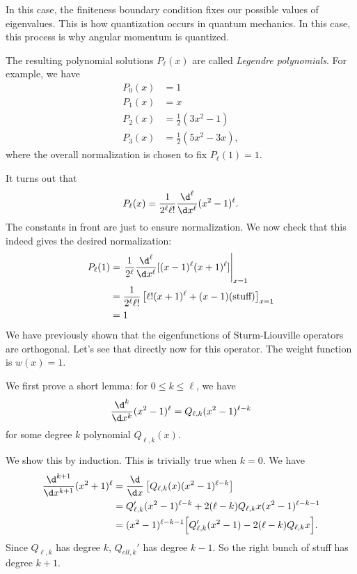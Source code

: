 \documentclass[a4paper]{article}
\begin{document}
In this case, the finiteness boundary condition fixes our possible values of eigenvalues. This is how quantization occurs in quantum mechanics. In this case, this process is why angular momentum is quantized.

The resulting polynomial solutions $P_\ell(x)$ are called \emph{Legendre polynomials}. For example, we have
\begin{align*}
  P_0(x) &= 1\\
  P_1(x) &= x\\
  P_2(x) &= \frac{1}{2}(3x^2 - 1)\\
  P_3(x) &= \frac{1}{2}(5x^2 - 3x),
\end{align*}
where the overall normalization is chosen to fix $P_\ell(1) = 1$.

It turns out that
\[
  P_\ell(x) = \frac{1}{2^\ell \ell!} \frac{\d^\ell}{\d x^\ell} (x^2 - 1)^\ell.
\]
The constants in front are just to ensure normalization. We now check that this indeed gives the desired normalization:
\begin{align*}
  P_\ell(1) &= \left.\frac{1}{2^\ell} \frac{\d^\ell}{\d x^\ell}[(x - 1)^\ell (x + 1)^\ell]\right|_{x = 1}\\
  &= \frac{1}{2^\ell \ell!} \left[\ell!(x + 1)^\ell + (x - 1)(\text{stuff})\right]_{x = 1}\\
  &= 1
\end{align*}
We have previously shown that the eigenfunctions of Sturm-Liouville operators are orthogonal. Let's see that directly now for this operator. The weight function is $w(x) = 1$.

We first prove a short lemma: for $0 \leq k \leq \ell$, we have
\[
  \frac{\d^k}{\d x^k}(x^2 - 1)^\ell = Q_{\ell, k}(x^2 - 1)^{\ell - k}
\]
for some degree $k$ polynomial $Q_{\ell, k}(x)$.

We show this by induction. This is trivially true when $k = 0$. We have
\begin{align*}
  \frac{\d^{k + 1}}{\d x^{k + 1}} (x^2 + 1)^\ell &= \frac{\d}{\d x}\left[Q_{\ell, k}(x) (x^2 - 1)^{\ell - k}\right] \\
  &= Q_{\ell, k}' (x^2 - 1)^{\ell - k} + 2(\ell - k)Q_{\ell, k} x(x^2 - 1)^{\ell - k - 1}\\
  &= (x^2 - 1)^{\ell - k - 1}\Big[Q_{\ell, k}'(x^2 - 1) - 2(\ell - k)Q_{\ell, k} x\Big].
\end{align*}
Since $Q_{\ell, k}$ has degree $k$, $Q_{ell, k}'$ has degree $k - 1$. So the right bunch of stuff has degree $k + 1$.
\end{document}
